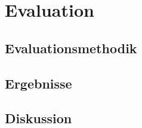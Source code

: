 \chapter{Evaluation}\label{ch:evaluation}


\section{Evaluationsmethodik}


\section{Ergebnisse}


\section{Diskussion}

